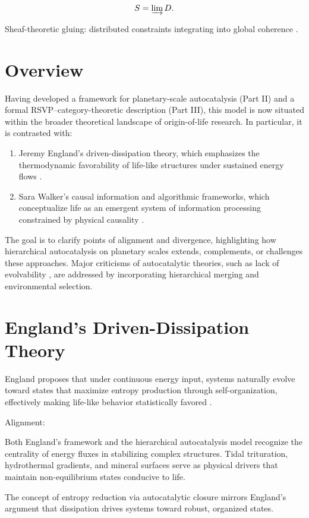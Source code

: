\documentclass{book}
\begin{document}
\[S = \varinjlim D.\]

Sheaf-theoretic gluing: distributed constraints integrating into global coherence \citep{steel2013}.

\section{Overview}
Having developed a framework for planetary-scale autocatalysis (Part II) and a formal RSVP–category-theoretic description (Part III), this model is now situated within the broader theoretical landscape of origin-of-life research. In particular, it is contrasted with:

\begin{enumerate}
\item Jeremy England’s driven-dissipation theory, which emphasizes the thermodynamic favorability of life-like structures under sustained energy flows \citep{england2013,england2015}.
\item Sara Walker’s causal information and algorithmic frameworks, which conceptualize life as an emergent system of information processing constrained by physical causality \citep{walker2013,walker2017}.
\end{enumerate}

The goal is to clarify points of alignment and divergence, highlighting how hierarchical autocatalysis on planetary scales extends, complements, or challenges these approaches. Major criticisms of autocatalytic theories, such as lack of evolvability \citep{vasas2010}, are addressed by incorporating hierarchical merging and environmental selection.

\section{England’s Driven-Dissipation Theory}
England proposes that under continuous energy input, systems naturally evolve toward states that maximize entropy production through self-organization, effectively making life-like behavior statistically favored \citep{england2013}.

Alignment:

Both England’s framework and the hierarchical autocatalysis model recognize the centrality of energy fluxes in stabilizing complex structures. Tidal trituration, hydrothermal gradients, and mineral surfaces serve as physical drivers that maintain non-equilibrium states conducive to life.

The concept of entropy reduction via autocatalytic closure mirrors England’s argument that dissipation drives systems toward robust, organized states.
\end{document}
